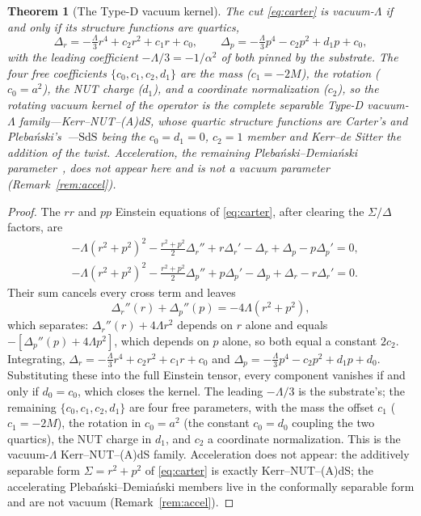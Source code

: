 \documentclass[11pt,a4paper]{article}
\newtheorem{theorem}{Theorem}
\theoremstyle{definition}
\begin{document}
\begin{theorem}[The Type-D vacuum kernel]\label{thm:pd}
The cut \eqref{eq:carter} is vacuum-$\Lambda$ if and only if its structure functions are quartics,
\begin{equation}\label{eq:quartics}
\Delta_{r}=-\tfrac{\Lambda}{3}r^{4}+c_{2}r^{2}+c_{1}r+c_{0},\qquad
\Delta_{p}=-\tfrac{\Lambda}{3}p^{4}-c_{2}p^{2}+d_{1}p+c_{0},
\end{equation}
with the leading coefficient $-\Lambda/3=-1/\alpha^{2}$ of both pinned by the substrate. The four free coefficients $\{c_{0},c_{1},c_{2},d_{1}\}$ are the mass ($c_{1}=-2M$), the rotation ($c_{0}=a^{2}$), the NUT charge ($d_{1}$), and a coordinate normalization ($c_{2}$), so the rotating vacuum kernel of the operator is the complete \emph{separable} Type-D vacuum-$\Lambda$ family---Kerr--NUT--(A)dS, whose quartic structure functions are Carter's and Plebański's~\cite{Carter1968,Plebanski1975,ChenLuPope2006}---$\mathrm{SdS}$ being the $c_{0}=d_{1}=0$, $c_{2}=1$ member and Kerr--de Sitter the addition of the twist. Acceleration, the remaining Plebański--Demiański parameter~\cite{PlebanskiDemianski}, does not appear here and is not a vacuum parameter (Remark~\ref{rem:accel}).
\end{theorem}

\begin{proof}
The $rr$ and $pp$ Einstein equations of \eqref{eq:carter}, after clearing the $\Sigma/\Delta$ factors, are
\begin{align*}
&-\Lambda(r^{2}+p^{2})^{2}-\tfrac{r^{2}+p^{2}}{2}\Delta_{r}''+r\Delta_{r}'-\Delta_{r}+\Delta_{p}-p\Delta_{p}'=0,\\
&-\Lambda(r^{2}+p^{2})^{2}-\tfrac{r^{2}+p^{2}}{2}\Delta_{p}''+p\Delta_{p}'-\Delta_{p}+\Delta_{r}-r\Delta_{r}'=0.
\end{align*}
Their sum cancels every cross term and leaves
\begin{equation}\label{eq:separated}
\Delta_{r}''(r)+\Delta_{p}''(p)=-4\Lambda(r^{2}+p^{2}),
\end{equation}
which separates: $\Delta_{r}''(r)+4\Lambda r^{2}$ depends on $r$ alone and equals $-[\Delta_{p}''(p)+4\Lambda p^{2}]$, which depends on $p$ alone, so both equal a constant $2c_{2}$. Integrating, $\Delta_{r}=-\tfrac{\Lambda}{3}r^{4}+c_{2}r^{2}+c_{1}r+c_{0}$ and $\Delta_{p}=-\tfrac{\Lambda}{3}p^{4}-c_{2}p^{2}+d_{1}p+d_{0}$. Substituting these into the full Einstein tensor, every component vanishes if and only if $d_{0}=c_{0}$, which closes the kernel. The leading $-\Lambda/3$ is the substrate's; the remaining $\{c_{0},c_{1},c_{2},d_{1}\}$ are four free parameters, with the mass the offset $c_{1}$ ($c_{1}=-2M$), the rotation in $c_{0}=a^{2}$ (the constant $c_{0}=d_{0}$ coupling the two quartics), the NUT charge in $d_{1}$, and $c_{2}$ a coordinate normalization. This is the vacuum-$\Lambda$ Kerr--NUT--(A)dS family. Acceleration does not appear: the additively separable form $\Sigma=r^{2}+p^{2}$ of \eqref{eq:carter} is exactly Kerr--NUT--(A)dS; the accelerating Plebański--Demiański members live in the conformally separable form and are not vacuum (Remark~\ref{rem:accel}).
\end{proof}
\end{document}
